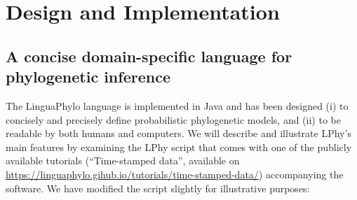 \documentclass[10pt,letterpaper,table]{article}
\begin{document}



\section*{Design and Implementation}

\subsection*{A concise domain-specific language for phylogenetic inference}



The LinguaPhylo language is implemented in Java and has been designed
(i) to concisely and precisely define probabilistic phylogenetic
models, and (ii) to be readable by both humans and computers.
We will describe and illustrate LPhy's main features by examining the
LPhy script that comes with one of the publicly available tutorials
(``Time-stamped data'', available on
\url{https://linguaphylo.gihub.io/tutorials/time-stamped-data/})
accompanying the software.
We have  modified the script slightly for illustrative purposes:
\end{document}
